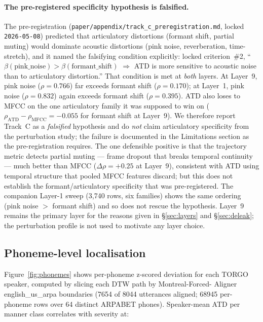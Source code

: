 \paragraph{The pre-registered specificity hypothesis is falsified.}
The pre-registration (\texttt{paper/appendix/track\_c\_preregistration.md},
locked \texttt{2026-05-08}) predicted that articulatory distortions
(formant shift, partial muting) would dominate acoustic distortions
(pink noise, reverberation, time-stretch), and it named the falsifying
condition explicitly: locked criterion~\#2, ``$\beta(\text{pink\_noise})
> \beta(\text{formant\_shift})$ $\Rightarrow$ ATD is more sensitive to
acoustic noise than to articulatory distortion.'' That condition is met
at \emph{both} layers. At Layer~9, pink noise ($\rho{=}0.766$) far
exceeds formant shift ($\rho{=}0.170$); at Layer~1, pink noise
($\rho{=}0.832$) again exceeds formant shift ($\rho{=}0.395$). ATD also
loses to MFCC on the one articulatory family it was supposed to win on
($\rho_{\text{ATD}} - \rho_{\text{MFCC}} = -0.055$ for formant shift at
Layer~9). We therefore report Track~C as a \emph{falsified} hypothesis
and do \emph{not} claim articulatory specificity from the perturbation
study; the failure is documented in the Limitations section as the
pre-registration requires. The one defensible positive is that the
trajectory metric detects partial muting --- frame dropout that breaks
temporal continuity --- much better than MFCC
($\Delta\rho{=}+0.25$ at Layer~9), consistent with ATD using temporal
structure that pooled MFCC features discard; but this does not establish
the formant/articulatory specificity that was pre-registered. The
companion Layer-1 sweep (3{,}740 rows, six families) shows the same
ordering (pink noise $>$ formant shift) and so does not rescue the
hypothesis. Layer~9 remains the primary layer for the reasons given in
\S\ref{sec:layers} and \S\ref{sec:deleak}; the perturbation profile is
not used to motivate any layer choice.

\subsection{Phoneme-level localisation}
Figure~\ref{fig:phonemes} shows per-phoneme z-scored deviation for each
TORGO speaker, computed by slicing each DTW path by Montreal-Forced-
Aligner english\_us\_arpa boundaries (7654 of 8044 utterances aligned;
68945 per-phoneme rows over 64 distinct ARPABET phones). Speaker-mean
ATD per manner class correlates with severity at:

